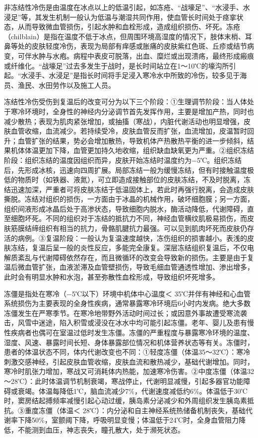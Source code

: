 非冻结性冷伤是由温度在冰点以上的低温引起，如冻疮、“战壕足”、“水浸手、水浸足”等，其发生机制一般认为低温与潮湿共同作用，使血管长时间处于痉挛状态，从而导致微血管损伤，引起水肿和血栓形成，造成组织损伤、坏死。冻疮（chilblain）是指在温度不低于冰点，但周围环境高湿度的情况下，肢体末梢、耳鼻等处的皮肤轻度冷伤，表现为局部有痒感或胀痛的皮肤紫红色斑、丘疹或结节病变，可伴水肿与水疱。病程中表皮可脱落，出血、糜烂或出现溃疡，最终形成瘢痕或纤维化。“战壕足”过去多发生于战时，是长时间站立在1～10℃的壕沟所引起。“水浸手、水浸足”是指长时间将手足浸入寒冷水中所致的冷伤，较多见于海员、渔民、水田劳作以及施工人员。

冻结性冷伤受伤到复温后的改变可分为以下三个阶段：①生理调节阶段：当人体处于寒冷环境时，全身性的神经内分泌调节首先发挥作用，主要是增加产热，同时也减少散热；表现为肌肉紧张增加，或抽搐（寒战），内脏代谢活动也明显增强，皮肤血管收缩，血流减少。若持续受冷，皮肤血管反而扩张，血流增加，皮温暂时回升；血管扩张的结果，势必会增加散热，导致机体产热散热平衡的进一步倾斜，结果机体体温更加下降，血管更加持久地收缩，组织缺血缺氧更为严重。②组织冻结阶段：组织冻结的温度因组织而异，皮肤开始冻结时温度约为−5℃。组织冻结后，先形成冰核，迅速向四周扩展。局部冻结一般为缓慢冻结，但有时接触温度极低的物质时（如铁器、液氮），可立即造成接触部位的皮肤冻结，不及时脱离，冻结迅速加深，严重者可将皮肤冻结于低温固体上，若此时再强行脱离，会造成皮肤撕脱。冻结对组织的损伤，一方面由于冰晶的机械作用，破坏细胞膜；另一方面，组织间液形成冰晶后处于高渗状态，导致细胞内脱水，酶活动降低，代谢障碍，直至细胞坏死。不同的组织对于冻结的抵抗力不同，神经血管横纹肌极易损伤，而皮肤筋膜结缔组织有相当的抗力，骨骼肌腱抗力最强。可以见到肌肉坏死而皮肤仍存活的病例。③复温阶段：一般认为复温速度越快，冻伤组织的损害越小。表浅的皮肤冻结，复温后呈一般的炎性反应，多能完全康复。深层冻结组织复温后，不仅电解质紊乱与代谢障碍依然存在，而且微循环的改变会导致新的损伤。主要是由于复温后微血管扩张，血液淤滞及血管壁损伤，导致毛细血管通透性增加、渗出增多，此时会有明显水肿和水泡，甚至弥散性血栓形成，导致组织坏死增多。

冻僵是指处在寒冷（−5℃以下）环境中机体中心温度＜
35℃并伴有神经和心血管系统损伤为主要表现的全身性疾病，通常暴露寒冷环境后6小时内发病。绝大多数冻僵发生在严寒季节。在寒冷地带野外活动时间过长；或因意外事故遭受寒流袭击，风雪中迷途，陷入积雪或浸没在冰水中均可能引起冻僵。老年、婴儿及患有慢性疾病者也偶可在室温过低时发生冻僵。冻僵的严重程度与暴露寒冷环境的温度、湿度、风速、暴露时间长短、身体暴露部位情况和机体营养状态等有关。冻僵时，患者的体温状态不同，体内代谢改变也不同：①轻度冻僵（体温35～32℃）：寒冷刺激交感神经，引起皮肤血管收缩，皮肤血流和散热减少，基础代谢增加。同时，寒冷时肌张力增加，寒战又可消耗体内热能，加速寒冷伤害。②中度冻僵（体温32～28℃）：此时体温调节机制衰竭，寒战停止，代谢明显减慢，引起多器官功能障碍或衰竭。体温每降低1℃，脑血流减少7\%，代谢速度减低约6\%。体温低于30℃时，窦房结起搏频率减慢引起心动过缓，胰岛素分泌减少和外周组织发生胰岛素抵抗。③重度冻僵（体温＜
28℃）：内分泌和自主神经系统热储备机制丧失，基础代谢率下降50\%，室颤阈下降，呼吸明显变慢；体温低于24℃时，全身血管阻力降低，不能测到血压，神志丧失，瞳孔散大，处于濒死状态。

